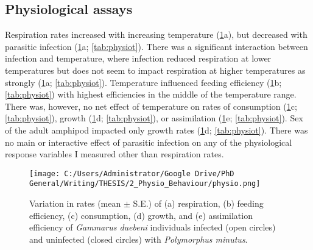 \subsection{Physiological assays}
Respiration rates increased with increasing temperature (\ref{fig:physio}a), but decreased with parasitic infection (\ref{fig:physio}a; \ref{tab:physiot}). There was a significant interaction between infection and temperature, where infection reduced respiration at lower temperatures but does not seem to impact respiration at higher temperatures as strongly (\ref{fig:physio}a; \ref{tab:physiot}). Temperature influenced feeding efficiency (\ref{fig:physio}b; \ref{tab:physiot}) with highest efficiencies in the middle of the temperature range. There was, however, no net effect of temperature on rates of consumption (\ref{fig:physio}c; \ref{tab:physiot}), growth (\ref{fig:physio}d; \ref{tab:physiot}), or assimilation (\ref{fig:physio}e; \ref{tab:physiot}). Sex of the adult amphipod impacted only growth rates (\ref{fig:physio}d; \ref{tab:physiot}). There was no main or interactive effect of parasitic infection on any of the physiological response variables I measured other than respiration rates. 

\begin{figure}%
    \centering
    \texttt{[image: C:/Users/Administrator/Google Drive/PhD General/Writing/THESIS/2\_Physio\_Behaviour/physio.png]}
  \caption [Impact of temperature and parasites on host physiology]{Variation in rates (mean  $\pm$ S.E.) of (a) respiration, (b) feeding efficiency, (c) consumption, (d) growth, and (e) assimilation efficiency of \emph{Gammarus duebeni} individuals infected (open circles) and uninfected (closed circles) with \emph{Polymorphus minutus}.} 
    \label{fig:physio}
\end{figure}

